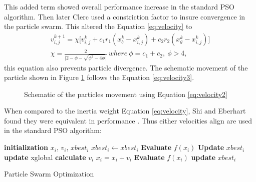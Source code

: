 This added term showed overall performance increase in the standard PSO algorithm. Then later Clerc \cite{} used a constriction factor to insure convergence in the particle swarm. This altered the Equation \ref{eq:velocity} to 
\begin{align}
    \label{eq:velocity3}
    v^{k+1}_{i,j} = \chi \big[ v^{k}_{i,j} + c_1r_1(x^{k}_b - x^{k}_{i,j}) + c_2r_2(x^{k}_g - x^{k}_{i,j}) \big] \\
    \chi = \frac{2}{\big| 2- \phi - \sqrt{\phi^2 - 4\phi}\big|}\ where\ \phi = c_1 + c_2,\ \phi>4, \nonumber
\end{align}
this equation also prevents particle divergence. The schematic movement of the particle shown in Figure \ref{fig:particle movement} follows the Equation \ref{eq:velocity3}.

\begin{figure}[!h]
    \centering
    
    \caption{Schematic of the particles movement using Equation \ref{eq:velocity2}}
    \label{fig:particle movement}
\end{figure}

When compared to the inertia weight Equation \ref{eq:velocity}, Shi and Eberhart found they were equivalent in performance \cite{}. 
Thus either velocities align are used in the standard PSO algorithm: 
\begin{algorithm}[H]
  \begin{algorithmic}[1]

        \State \textbf{initialization} $x_i$, $v_i$, $xbest_i$ 
        $xbest_i \gets xbest_i$
        \State \textbf{Evaluate} $f(x_i)$  
        \State \textbf{Update} $xbest_i$ 
    \EndFor
            \State \textbf{update} xglobal 
            \State \textbf{calculate} $v_i$ 
            \State $x_i = x_i + v_i$
            \State \textbf{Evaluate} $f(x_i)$
            \State \textbf{update} $xbest_i$
        \EndFor
    \EndWhile
  \end{algorithmic}
\caption{Particle Swarm Optimization}
\label{algorithmPSO}
\end{algorithm}

